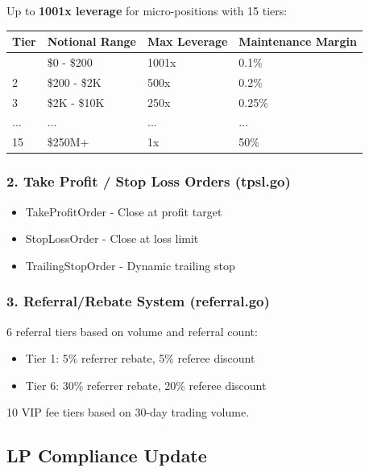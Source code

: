\documentclass[
]{article}
\newcounter{none} %
\providecommand{\tightlist}{%
  \setlength{\itemsep}{0pt}\setlength{\parskip}{0pt}}
\begin{document}
Up to \textbf{1001x leverage} for micro-positions with 15 tiers:

{\def\LTcaptype{none} %
\begin{longtable}[]{@{}llll@{}}
\toprule\noalign{}
Tier & Notional Range & Max Leverage & Maintenance Margin \\
\midrule\noalign{}
\endhead
\bottomrule\noalign{}
\endlastfoot
1 & \$0 - \$200 & 1001x & 0.1\% \\
2 & \$200 - \$2K & 500x & 0.2\% \\
3 & \$2K - \$10K & 250x & 0.25\% \\
... & ... & ... & ... \\
15 & \$250M+ & 1x & 50\% \\
\end{longtable}
}

\subsubsection{2. Take Profit / Stop Loss Orders
(tpsl.go)}\label{2-take-profit--stop-loss-orders-tpslgo}

\begin{itemize}
\tightlist
\item
  TakeProfitOrder - Close at profit target
\item
  StopLossOrder - Close at loss limit
\item
  TrailingStopOrder - Dynamic trailing stop
\end{itemize}

\subsubsection{3. Referral/Rebate System
(referral.go)}\label{3-referralrebate-system-referralgo}

6 referral tiers based on volume and referral count:

\begin{itemize}
\tightlist
\item
  Tier 1: 5\% referrer rebate, 5\% referee discount
\item
  Tier 6: 30\% referrer rebate, 20\% referee discount
\end{itemize}

10 VIP fee tiers based on 30-day trading volume.

\subsection{LP Compliance Update}\label{lp-compliance-update}
\end{document}
